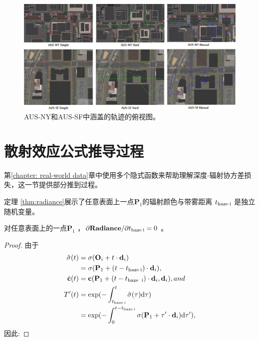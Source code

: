 \begin{appendices}
\begin{figure}[htbp]
    \centering
    \includegraphics[width=\textwidth]{undergraduate-thesis/images/time-pose function/city-top-view.pdf}
    \caption{AUS-NY和AUS-SF中涵盖的轨迹的俯视图。}
    \label{fig:supp-city-top-view}
\end{figure}




\section{散射效应公式推导过程}
第\ref{chapter: real-world data}章中使用多个隐式函数来帮助理解深度-辐射协方差损失，这一节提供部分推到过程。

定理 \ref{thm:radiance}展示了任意表面上一点$\mathbf P_1$的辐射颜色与带雾距离 $t_\text{haze\:i}$ 是独立随机变量。 

\begin{theorem}
对任意表面上的一点$\mathbf P_1$ ，$\partial\mathbf{Radiance}/\partial t_\text{haze\:i} = 0$  。
\label{thm:radiance}
\end{theorem}
\begin{proof}  由于
\begin{align*}
\hat\sigma(t)&=\sigma(\mathbf{O}_i+t\cdot\mathbf d_i)\\
&=\sigma(\mathbf P_1 + (t-t_\text{haze\:i})\cdot\mathbf d_i),\\
\hat{\mathbf c}(t) &= \mathbf c(\mathbf P_1 + (t-t_\text{haze\: i})\cdot\mathbf{d}_i,\mathbf d_i), and\\
T'(t) &= \exp(-\int_{t_\text{haze\:i}}^t\hat\sigma(\tau)\text d\tau)\\
&=\exp(-\int_{0}^{t-t_\text{haze\:i}                    }\sigma(\mathbf P_1 + \tau'\cdot \mathbf d_i)\text d\tau'),
\end{align*}
因此: 


\end{proof}
\end{appendices}
